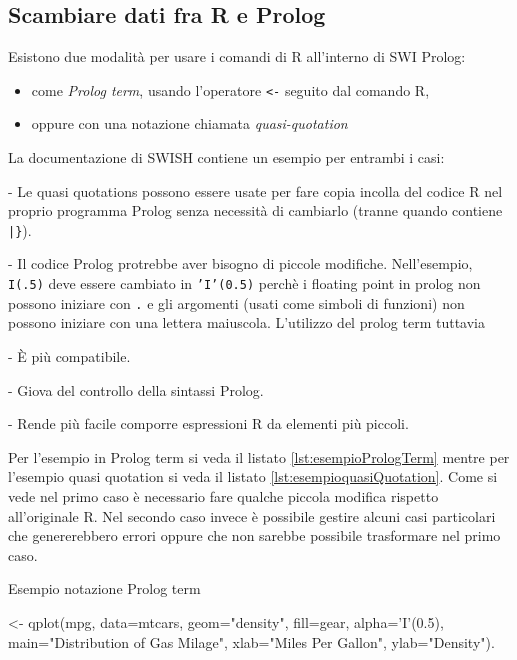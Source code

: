 \documentclass[10pt,titlepage,twoside,a4paper]{report}
\newenvironment{code}{\singlespacing\captionsetup{type=listing}}{}
\begin{document}
\subsection{Scambiare dati fra R e Prolog}
Esistono due modalità per usare i comandi di R all'interno di SWI Prolog:
\begin{itemize}
    \item come \emph{Prolog term}, usando l'operatore \texttt{<-} 
seguito dal comando R,
    \item oppure con una notazione chiamata \emph{quasi-quotation}
\end{itemize}
La documentazione di SWISH contiene un esempio per entrambi i 
casi\cite{rprolognotations}:
\begin{displayquote}
- Le quasi quotations possono essere usate per fare copia incolla del codice R 
nel proprio programma Prolog senza necessità di cambiarlo (tranne quando 
contiene \texttt{|\}}).

- Il codice Prolog protrebbe aver bisogno di piccole modifiche. Nell'esempio,
  \texttt{I(.5)} deve essere cambiato in \texttt{'I'(0.5)} perchè 
  i floating point in prolog non possono iniziare con \texttt{.} e gli 
  argomenti (usati come simboli di funzioni) non possono iniziare con una lettera 
  maiuscola. L'utilizzo del prolog term tuttavia

    - È più compatibile.

    - Giova del controllo della sintassi Prolog.

    - Rende più facile comporre espressioni R da elementi più piccoli.
\end{displayquote}
Per l'esempio in Prolog term si veda il listato \ref{lst:esempioPrologTerm}
mentre per l'esempio quasi quotation si veda il 
listato \ref{lst:esempioquasiQuotation}.
Come si vede nel primo caso è necessario fare qualche piccola modifica 
rispetto all'originale R. Nel secondo caso invece è possibile gestire alcuni 
casi particolari che genererebbero errori oppure che non sarebbe possibile 
trasformare nel primo caso.

\begin{code}
    \caption{Esempio notazione Prolog term}
    \label{lst:esempioPrologTerm}
    \begin{prologcode*}{}
<- qplot(mpg, data=mtcars, geom="density", fill=gear, alpha='I'(0.5), main="Distribution of Gas Milage", xlab="Miles Per Gallon", ylab="Density").
    \end{prologcode*}
\end{code}
\end{document}
